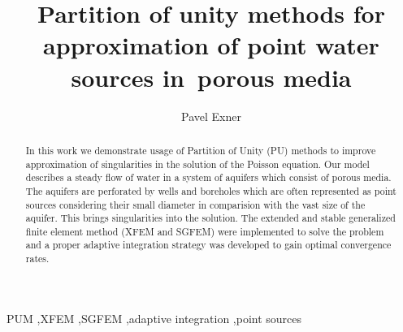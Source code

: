 \documentclass[preprint,12pt,authoryear]{elsarticle}
\begin{document}
\begin{frontmatter}



\title{Partition of unity methods for approximation of point water sources in~porous media}


\author{Pavel Exner}
\address{Technical University of Liberec, Studentsk{\' a} 1402/2, 461 17 Liberec 1, Czech Republic}

\begin{abstract}
In this work we demonstrate usage of Partition of Unity (PU) methods to improve approximation of singularities 
in the solution of the Poisson equation. Our model describes a steady flow of water in a system of aquifers
which consist of porous media. The aquifers are perforated by wells and boreholes which are often represented
as point sources considering their small diameter in comparision with the vast size of the aquifer. This 
brings singularities into the solution. The extended and stable generalized finite element method 
(XFEM and SGFEM) were implemented to solve the problem and a proper adaptive integration strategy was 
developed to gain optimal convergence rates.
\end{abstract}

\begin{keyword}
PUM \sep XFEM \sep SGFEM \sep adaptive integration \sep point sources



\end{keyword}

\end{frontmatter}
\end{document}
